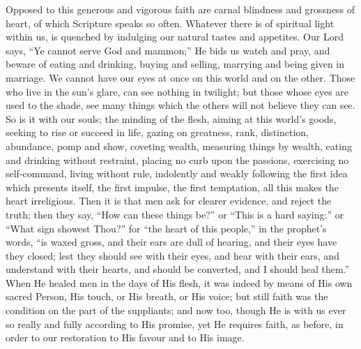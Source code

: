 Opposed to this generous and vigorous faith are carnal blindness and
grossness of heart, of which Scripture speaks so often. Whatever there
is of spiritual light within us, is quenched by indulging our natural
tastes and appetites. Our Lord says, ``Ye cannot serve God and
mammon;'' He bids us watch and pray, and beware of eating and
drinking, buying and selling, marrying and being given in marriage. We
cannot have our eyes at once on this world and on the other. Those who
live in the sun's glare, can see nothing in twilight; but those whose
eyes are used to the shade, see many things which the others will not
believe they can see. So is it with our souls; the minding of the flesh,
aiming at this world's goods, seeking to rise or succeed in life, gazing
on greatness, rank, distinction, abundance, pomp and show, coveting
wealth, measuring things by wealth, eating and drinking without
restraint, placing no curb upon the passions, exercising no
self-command, living without rule, indolently and weakly following the
first idea which presents itself, the first impulse, the first
temptation, all this makes the heart irreligious. Then it is that men
ask for clearer evidence, and reject the truth; then they say, ``How
can these things be?'' or ``This is a hard saying:'' or
``What sign showest Thou?'' for ``the heart of this
people,'' in the prophet's words, ``is waxed gross, and their
ears are dull of hearing, and their eyes have they closed; lest they
should see with their eyes, and hear with their ears, and understand
with their hearts, and should be converted, and I should heal
them.'' When He healed men in the days of His flesh, it was indeed
by means of His own sacred Person, His touch, or His breath, or His
voice; but still faith was the condition on the part of the suppliants;
and now too, though He is with us ever so really and fully according to
His promise, yet He requires faith, as before, in order to our
restoration to His favour and to His image.

